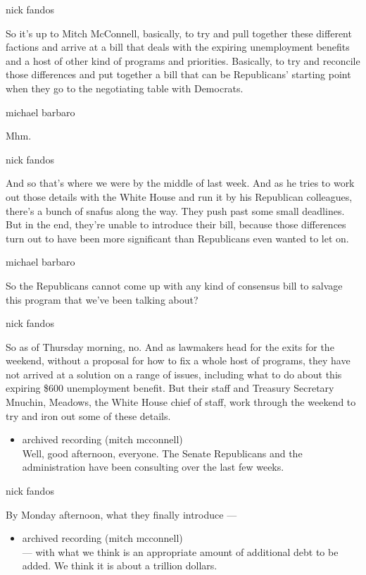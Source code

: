 nick fandos

So it's up to Mitch McConnell, basically, to try and pull together these
different factions and arrive at a bill that deals with the expiring
unemployment benefits and a host of other kind of programs and
priorities. Basically, to try and reconcile those differences and put
together a bill that can be Republicans' starting point when they go to
the negotiating table with Democrats.

michael barbaro

Mhm.

nick fandos

And so that's where we were by the middle of last week. And as he tries
to work out those details with the White House and run it by his
Republican colleagues, there's a bunch of snafus along the way. They
push past some small deadlines. But in the end, they're unable to
introduce their bill, because those differences turn out to have been
more significant than Republicans even wanted to let on.

michael barbaro

So the Republicans cannot come up with any kind of consensus bill to
salvage this program that we've been talking about?

nick fandos

So as of Thursday morning, no. And as lawmakers head for the exits for
the weekend, without a proposal for how to fix a whole host of programs,
they have not arrived at a solution on a range of issues, including what
to do about this expiring \$600 unemployment benefit. But their staff
and Treasury Secretary Mnuchin, Meadows, the White House chief of staff,
work through the weekend to try and iron out some of these details.

\begin{itemize}
\tightlist
\item
  archived recording (mitch mcconnell)\\
  Well, good afternoon, everyone. The Senate Republicans and the
  administration have been consulting over the last few weeks.
\end{itemize}

nick fandos

By Monday afternoon, what they finally introduce ---

\begin{itemize}
\tightlist
\item
  archived recording (mitch mcconnell)\\
  --- with what we think is an appropriate amount of additional debt to
  be added. We think it is about a trillion dollars.
\end{itemize}


